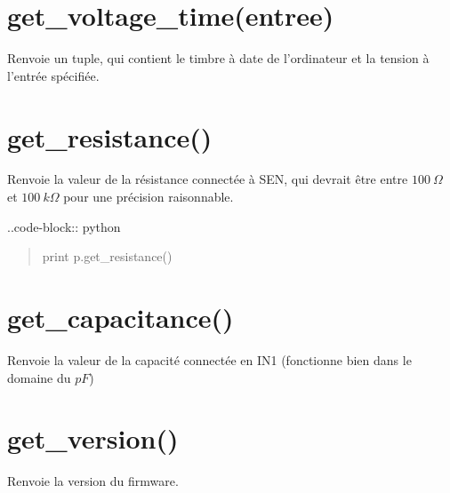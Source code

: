 \documentclass[a4paper,12pt,french]{sphinxmanual}
\begin{document}
\section{get\_voltage\_time(entree)}
\label{\detokenize{9.0:get-voltage-time-entree}}
Renvoie un tuple, qui contient le timbre à date de l’ordinateur et
la tension à l’entrée spécifiée.

\begin{sphinxVerbatim}[commandchars=\\\{\}]
 
\end{sphinxVerbatim}


\section{get\_resistance()}
\label{\detokenize{9.0:get-resistance}}
Renvoie la valeur de la résistance connectée à SEN, qui devrait être
entre \(100~\Omega\) et \(100~k\Omega\) pour une précision raisonnable.

..code-block:: python
\begin{quote}

print p.get\_resistance()
\end{quote}


\section{get\_capacitance()}
\label{\detokenize{9.0:get-capacitance}}
Renvoie la valeur de la capacité connectée en IN1 (fonctionne bien
dans le domaine du \(pF\))

\begin{sphinxVerbatim}[commandchars=\\\{\}]
 
\end{sphinxVerbatim}


\section{get\_version()}
\label{\detokenize{9.0:get-version}}
Renvoie la version du firmware.

\begin{sphinxVerbatim}[commandchars=\\\{\}]
 
\end{sphinxVerbatim}
\end{document}
